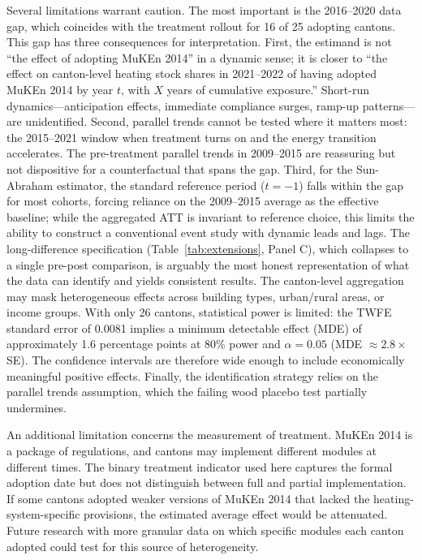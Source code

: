 \documentclass[12pt]{article}
\begin{document}
Several limitations warrant caution. The most important is the 2016--2020 data gap, which coincides with the treatment rollout for 16 of 25 adopting cantons. This gap has three consequences for interpretation. First, the estimand is not ``the effect of adopting MuKEn 2014'' in a dynamic sense; it is closer to ``the effect on canton-level heating stock shares in 2021--2022 of having adopted MuKEn 2014 by year $t$, with $X$ years of cumulative exposure.'' Short-run dynamics---anticipation effects, immediate compliance surges, ramp-up patterns---are unidentified. Second, parallel trends cannot be tested where it matters most: the 2015--2021 window when treatment turns on and the energy transition accelerates. The pre-treatment parallel trends in 2009--2015 are reassuring but not dispositive for a counterfactual that spans the gap. Third, for the Sun-Abraham estimator, the standard reference period ($t = -1$) falls within the gap for most cohorts, forcing reliance on the 2009--2015 average as the effective baseline; while the aggregated ATT is invariant to reference choice, this limits the ability to construct a conventional event study with dynamic leads and lags. The long-difference specification (Table~\ref{tab:extensions}, Panel C), which collapses to a single pre-post comparison, is arguably the most honest representation of what the data can identify and yields consistent results. The canton-level aggregation may mask heterogeneous effects across building types, urban/rural areas, or income groups. With only 26 cantons, statistical power is limited: the TWFE standard error of 0.0081 implies a minimum detectable effect (MDE) of approximately 1.6 percentage points at 80\% power and $\alpha = 0.05$ (MDE $\approx 2.8 \times$ SE). The confidence intervals are therefore wide enough to include economically meaningful positive effects. Finally, the identification strategy relies on the parallel trends assumption, which the failing wood placebo test partially undermines.

An additional limitation concerns the measurement of treatment. MuKEn 2014 is a package of regulations, and cantons may implement different modules at different times. The binary treatment indicator used here captures the formal adoption date but does not distinguish between full and partial implementation. If some cantons adopted weaker versions of MuKEn 2014 that lacked the heating-system-specific provisions, the estimated average effect would be attenuated. Future research with more granular data on which specific modules each canton adopted could test for this source of heterogeneity.
\end{document}
